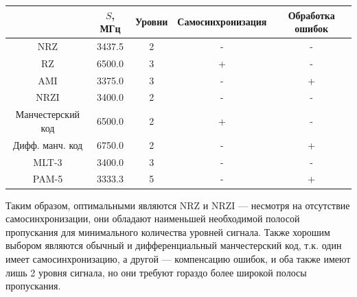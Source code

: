 \begin{center}
    \begin{tabular}{c|cccc}
        & $S$, МГц
        & Уровни
        & Самосинхронизация
        & Обработка ошибок \\ \hline
        NRZ               & 3437.5 & 2 & - & - \\
        RZ                & 6500.0 & 3 & + & - \\
        AMI               & 3375.0 & 3 & - & + \\
        NRZI              & 3400.0 & 2 & - & - \\
        Манчестерский код & 6500.0 & 2 & + & - \\
        Дифф. манч. код   & 6750.0 & 2 & - & + \\
        MLT-3             & 3400.0 & 3 & - & - \\
        PAM-5             & 3333.3 & 5 & - & + \\
    \end{tabular}
\end{center}

Таким образом, оптимальными являются NRZ и NRZI --- несмотря на отсутствие самосинхронизации,
они обладают наименьшей необходимой полосой пропускания для минимального количества уровней сигнала.
Также хорошим выбором являются обычный и дифференциальный манчестерский код, т.к.
один имеет самосинхронизацию, а другой --- компенсацию ошибок, и оба также имеют лишь 2 уровня сигнала,
но они требуют гораздо более широкой полосы пропускания.

